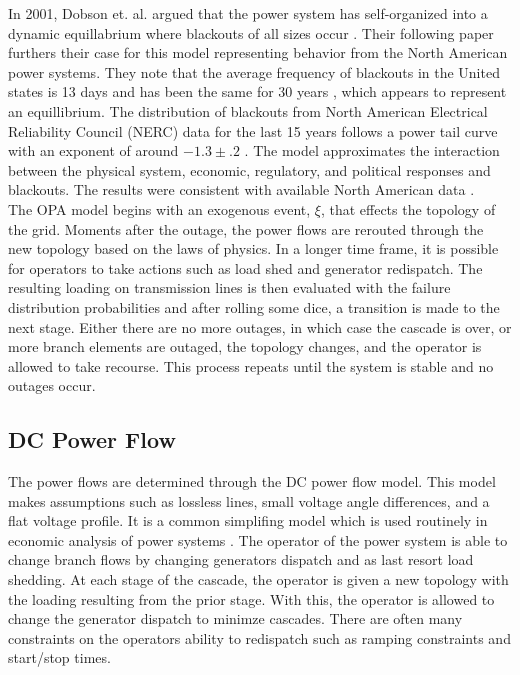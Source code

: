 In 2001, Dobson et. al. argued that the power system has self-organized into a dynamic equillabrium where blackouts of all sizes occur \cite{Dobson_2001}.  Their following paper furthers their case for this model representing behavior from the North American power systems.  They note that the average frequency of blackouts in the United states is 13 days and has been the same for 30 years \cite{Carreras_2004}, which appears to represent an equillibrium.  The distribution of blackouts from North American Electrical Reliability Council (NERC) data for the last 15 years follows a power tail curve with an exponent of around $-1.3\pm.2$ \cite{Carreras_2004}.  The model approximates the interaction between the physical system, economic, regulatory, and political responses and blackouts.  The results were consistent with available North American data \cite{Carreras_2004}.   \\

The OPA model begins with an exogenous event, $\xi$, that effects the topology of the grid.  Moments after the outage, the power flows are rerouted through the new topology based on the laws of physics.  In a longer time frame, it is possible for operators to take actions such as load shed and generator redispatch.  The resulting loading on transmission lines is then evaluated with the failure distribution probabilities and after rolling some dice, a transition is made to the next stage.  Either there are no more outages, in which case the cascade is over, or more branch elements are outaged, the topology changes, and the operator is allowed to take recourse.  This process repeats until the system is stable and no outages occur.  




\subsection{DC Power Flow}

The power flows are determined through the DC power flow model.  This model makes assumptions such as lossless lines, small voltage angle differences, and a flat voltage profile.  It is a common simplifing model which is used routinely in economic analysis of power systems \cite{power_flow}.  The operator of the power system is able to change branch flows by changing generators dispatch and as last resort load shedding.  At each stage of the cascade, the operator is given a new topology with the loading resulting from the prior stage.  With this, the operator is allowed to change the generator dispatch to minimze cascades.  There are often many constraints on the operators ability to redispatch such as ramping constraints and start/stop times.	\\

